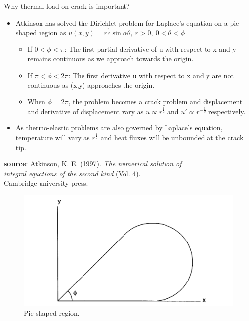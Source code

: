 \documentclass{beamer}
\begin{document}
\begin{frame}[t,fragile]{Why thermal load on crack is important?}
    \vspace{-.3cm}
    \footnotesize
\begin{itemize}
    \item Atkinson has solved the Dirichlet problem for Laplace's equation on a pie shaped region as $u(x,y)= r^{\frac{\pi}{\phi}}\sin\alpha\theta,\  r>0,\ 0<\theta<\phi$
        \begin{itemize}
                \footnotesize
    \item If $0<\phi<\pi$:
        The first partial derivative of u with respect to x and y remains continuous as we approach towards the origin. 
    \item If $\pi<\phi<2\pi$:
        The first derivative u with respect to x and y are not continuous as (x,y) approaches the origin. 
       \item When $\phi=2\pi$, the problem becomes a crack problem and displacement and derivative of displacement vary as $u \propto r^{\frac{1}{2}}$ and $u'\propto  r^{-\frac{1}{2}}$ respectively. 
  \end{itemize}
   \item As thermo-elastic problems are also governed by Laplace's equation, temperature will vary as $r^{\frac{1}{2}}$ and heat fluxes will be unbounded at the crack tip. 
\end{itemize}
  \tiny
  \vspace{10pt}
  \hspace{10pt}
   \textbf{source}: Atkinson, K. E. (1997).
    \emph{The numerical solution of \\
  \hspace{10pt}
    integral equations of the second kind} (Vol. 4). \\
  \hspace{10pt}
    Cambridge university press.
     \begin{figure}
    \centering
    \vspace{-50pt}
    \includegraphics[width=.3\textwidth]{pie.png}
    \caption{\footnotesize Pie-shaped region.}
    \label{pie}
\end{figure}
 
\end{frame}
\end{document}
